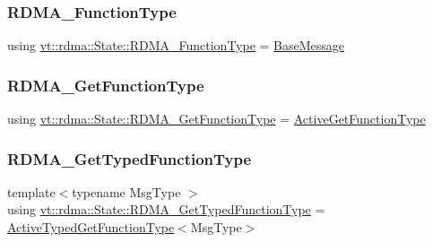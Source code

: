 \mbox{\label{structvt_1_1rdma_1_1_state_afc917e98beaf9cde735f096552029f3a}} 
\subsubsection{\texorpdfstring{R\+D\+M\+A\+\_\+\+Function\+Type}{RDMA\_FunctionType}}
{\footnotesize\ttfamily using \hyperlink{structvt_1_1rdma_1_1_state_afc917e98beaf9cde735f096552029f3a}{vt\+::rdma\+::\+State\+::\+R\+D\+M\+A\+\_\+\+Function\+Type} =  \hyperlink{namespacevt_ac34f95a5e2b8109b55bfba52b074443d}{Base\+Message}}

\mbox{\label{structvt_1_1rdma_1_1_state_af0baaa6ac5c3b7b256d032f2ee845676}} 
\subsubsection{\texorpdfstring{R\+D\+M\+A\+\_\+\+Get\+Function\+Type}{RDMA\_GetFunctionType}}
{\footnotesize\ttfamily using \hyperlink{structvt_1_1rdma_1_1_state_af0baaa6ac5c3b7b256d032f2ee845676}{vt\+::rdma\+::\+State\+::\+R\+D\+M\+A\+\_\+\+Get\+Function\+Type} =  \hyperlink{namespacevt_1_1rdma_af564945ba7e35e15bccfb9c2a8d7ebd7}{Active\+Get\+Function\+Type}}

\mbox{\label{structvt_1_1rdma_1_1_state_a95b006a568982435e63aa18feb5fc202}} 
\subsubsection{\texorpdfstring{R\+D\+M\+A\+\_\+\+Get\+Typed\+Function\+Type}{RDMA\_GetTypedFunctionType}}
{\footnotesize\ttfamily template$<$typename Msg\+Type $>$ \\
using \hyperlink{structvt_1_1rdma_1_1_state_a95b006a568982435e63aa18feb5fc202}{vt\+::rdma\+::\+State\+::\+R\+D\+M\+A\+\_\+\+Get\+Typed\+Function\+Type} =  \hyperlink{namespacevt_1_1rdma_a903d8f605dadc2456d4a1c6fcb83eda4}{Active\+Typed\+Get\+Function\+Type}$<$Msg\+Type$>$}

